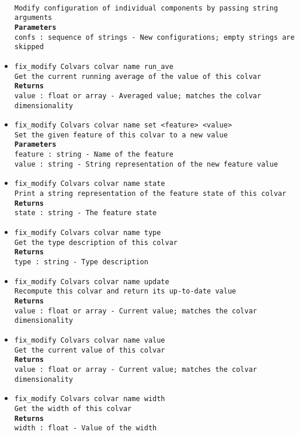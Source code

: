\begin{itemize}
\\
\texttt{Modify configuration of individual components by passing string arguments}
\\
\texttt{\textbf{Parameters}}
\\
\texttt{confs : sequence of strings - New configurations; empty strings are skipped}
\item \texttt{fix\_modify Colvars colvar name run\_ave}
\\
\texttt{Get the current running average of the value of this colvar}
\\
\texttt{\textbf{Returns}}
\\
\texttt{value : float or array - Averaged value; matches the colvar dimensionality}
\item \texttt{fix\_modify Colvars colvar name set <feature> <value>}
\\
\texttt{Set the given feature of this colvar to a new value}
\\
\texttt{\textbf{Parameters}}
\\
\texttt{feature : string - Name of the feature}
\\
\texttt{value : string - String representation of the new feature value}
\item \texttt{fix\_modify Colvars colvar name state}
\\
\texttt{Print a string representation of the feature state of this colvar}
\\
\texttt{\textbf{Returns}}
\\
\texttt{state : string - The feature state}
\item \texttt{fix\_modify Colvars colvar name type}
\\
\texttt{Get the type description of this colvar}
\\
\texttt{\textbf{Returns}}
\\
\texttt{type : string - Type description}
\item \texttt{fix\_modify Colvars colvar name update}
\\
\texttt{Recompute this colvar and return its up-to-date value}
\\
\texttt{\textbf{Returns}}
\\
\texttt{value : float or array - Current value; matches the colvar dimensionality}
\item \texttt{fix\_modify Colvars colvar name value}
\\
\texttt{Get the current value of this colvar}
\\
\texttt{\textbf{Returns}}
\\
\texttt{value : float or array - Current value; matches the colvar dimensionality}
\item \texttt{fix\_modify Colvars colvar name width}
\\
\texttt{Get the width of this colvar}
\\
\texttt{\textbf{Returns}}
\\
\texttt{width : float - Value of the width}
\end{itemize}
